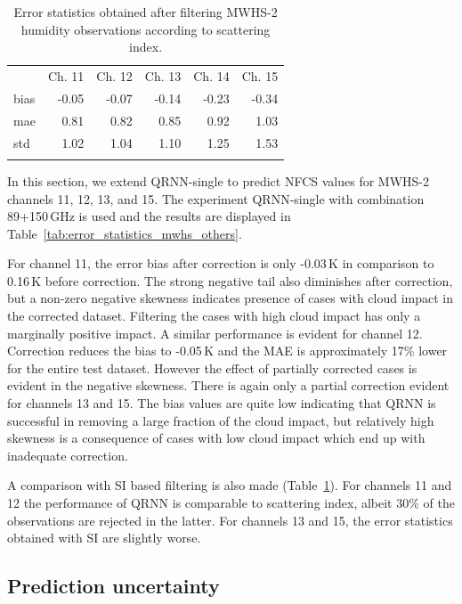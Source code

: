 \documentclass[amt]{copernicus}
\begin{document}
\begin{table}[t]
	\caption{Error statistics obtained after filtering MWHS-2 humidity observations according to scattering index.  }
	\label{tab:SI_statistics}
	\begin{tabular}{lrrrrr}
		\tophline
		& Ch. 11 & Ch. 12 & Ch. 13 & Ch. 14 & Ch. 15\\
			\cline{2-6}
		bias     & -0.05&  -0.07 & -0.14 & -0.23 &  -0.34\\
		mae      & 0.81 &   0.82 &  0.85 &  0.92 &  1.03\\
		std      & 1.02 &   1.04 &  1.10 &  1.25 &  1.53\\
		\bottomhline
	\end{tabular}
\end{table}

In this section, we extend QRNN-single to predict NFCS values for MWHS-2 channels 11, 12, 13, and 15. The experiment QRNN-single with combination 89+150\,GHz is used and the results are displayed in  Table~\ref{tab:error_statistics_mwhs_others}.

For channel 11, the error bias after correction is only -0.03\,K in comparison to 0.16\,K before correction. The strong negative tail also diminishes after correction, but a non-zero negative skewness indicates presence of cases with cloud impact in the corrected dataset. Filtering the cases with high cloud impact has only a marginally positive impact. A similar performance is evident for channel 12. Correction reduces the bias to -0.05\,K and the MAE is approximately 17\% lower for the entire test dataset. However the effect of partially corrected cases is evident in the negative skewness. There is again only a partial correction evident for channels 13 and 15. The bias values are quite low indicating that QRNN is successful in removing a large fraction of the cloud impact, but relatively high skewness is a consequence of cases with low cloud impact which end up with inadequate correction.  

A comparison with SI based filtering is also made (Table~\ref{tab:SI_statistics}). For channels 11 and 12 the performance of QRNN is comparable to scattering index, albeit 30\% of the observations are rejected in the latter. For channels 13 and 15, the error statistics obtained with SI are slightly worse.   


\subsection{Prediction uncertainty}
\end{document}

